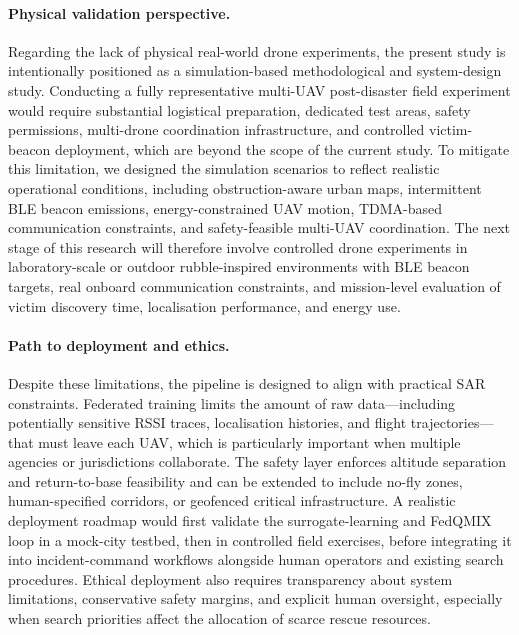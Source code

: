 \documentclass[drones,article,accept,pdftex,moreauthors]{Definitions/mdpi}
\begin{document}
\paragraph{Physical validation perspective.}
Regarding the lack of physical real-world drone experiments, the present
study is intentionally positioned as a simulation-based methodological
and system-design study. Conducting a fully representative multi-UAV
post-disaster field experiment would require substantial logistical
preparation, dedicated test areas, safety permissions, multi-drone
coordination infrastructure, and controlled victim-beacon deployment,
which are beyond the scope of the current study. To mitigate this
limitation, we designed the simulation scenarios to reflect realistic
operational conditions, including obstruction-aware urban maps,
intermittent BLE beacon emissions, energy-constrained UAV motion,
TDMA-based communication constraints, and safety-feasible multi-UAV
coordination. The next stage of this research will therefore involve
controlled drone experiments in laboratory-scale or outdoor
rubble-inspired environments with BLE beacon targets, real onboard
communication constraints, and mission-level evaluation of victim
discovery time, localisation performance, and energy use. 

\paragraph{Path to deployment and ethics.}
Despite these limitations, the pipeline is designed to align with practical SAR
constraints. Federated training limits the amount of raw data---including
potentially sensitive RSSI traces, localisation histories, and flight
trajectories---that must leave each UAV, which is particularly important when
multiple agencies or jurisdictions collaborate. The safety layer enforces
altitude separation and return-to-base feasibility and can be extended to
include no-fly zones, human-specified corridors, or geofenced critical
infrastructure. A realistic deployment roadmap would first validate the
surrogate-learning and FedQMIX loop in a mock-city testbed, then in controlled
field exercises, before integrating it into incident-command workflows
alongside human operators and existing search procedures. Ethical deployment
also requires transparency about system limitations, conservative safety
margins, and explicit human oversight, especially when search priorities affect
the allocation of scarce rescue resources.
\end{document}
